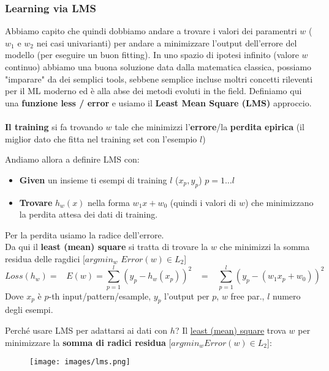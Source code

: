 \subsubsection{Learning via LMS}
Abbiamo capito che quindi dobbiamo andare a trovare i valori dei paramentri $w$ ($w_1$ e $w_2$ nei casi univarianti) per andare a minimizzare 
l'output dell'errore del modello (per eseguire un buon fitting). In uno spazio di ipotesi infinito (valore $w$ continuo) abbiamo una buona soluzione
data dalla matematica classica, possiamo "imparare" da dei semplici tools, sebbene semplice incluse moltri concetti rileventi per
il ML moderno ed è alla abse dei metodi evoluti in the field. Definiamo qui una \textbf{funzione less / error} e usiamo il \textbf{Least Mean Square (LMS)} approccio.\\\\
\textbf{Il training} si fa trovando $w$ tale che minimizzi l'\textbf{errore}/la \textbf{perdita epirica} (il miglior dato che fitta nel training set con l'esempio $l$)

\begin{definition}
    Andiamo allora a definire LMS con:
    \begin{itemize}
        \item \textbf{Given} un insieme ti esempi di training $l$ ($x_p, y_p$) $p = 1 \dots l$
        \item \textbf{Trovare} $h_w(x)$ nella forma $w_1 x + w_0$ (quindi i valori di $w$) che minimizzano la perdita attesa dei dati di training.
    \end{itemize}
    Per la perdita usiamo la radice dell'errore.\\
    Da qui il \textbf{least (mean) square} si tratta di trovare la $w$ che minimizzi la somma residua delle ragdici [$argmin_w$ $Error(w) \in L_2$]
    $$Loss(h_w) = \hspace{10pt}E(w) = \sum_{p=1}^{l} (y_p - h_w(x_p))^2 \hspace{10pt}=\hspace{10pt} \sum_{p=1}^{l}(y_p - (w_1 x_p + w_0))^2$$
    Dove $x_p$ è $p$-th input/pattern/esample, $y_p$ l'output per $p$, $w$ free par., $l$ numero degli esempi.
\end{definition}
\hspace{-15pt}Perché usare LMS per adattarsi ai dati con $h$? Il \underline{least (mean) square} trova $w$ per minimizzare la \textbf{somma di radici residua} [$argmin_w Error(w) \in L_2$]:
\begin{figure}[h!]
    \centering
    \texttt{[image: images/lms.png]}
\end{figure}

